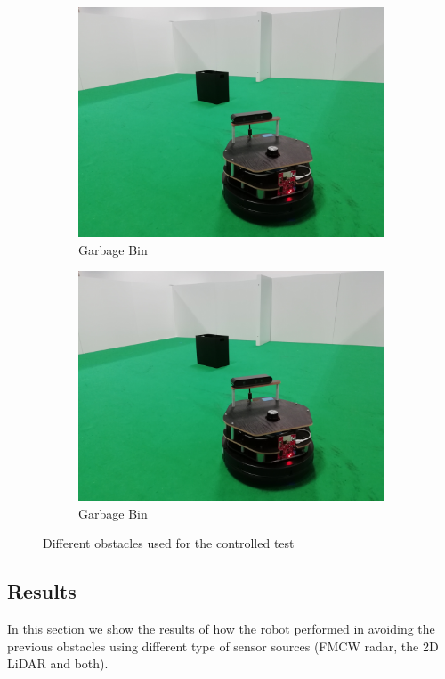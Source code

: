 \begin{figure}[h!]
\begin{subfigure}[b]{0.3\linewidth}
    \includegraphics[width=\linewidth]{imgs/chapter5/garbage.jpg}
    \caption{Garbage Bin}
    \label{fig::garbage}
  \end{subfigure}
  \begin{subfigure}[b]{0.3\linewidth}
    \includegraphics[width=\linewidth]{imgs/chapter5/garbage.jpg}
    \caption{Garbage Bin}
    \label{fig::garbage}
  \end{subfigure}
  \caption{Different obstacles used for the controlled test}
  \label{fig:obstacles}
\end{figure}


\subsection{Results}
In this section we show the results of how the robot performed in avoiding the previous obstacles using different type of sensor sources (\ac{FMCW} radar, the 2D \ac{LiDAR} and both).

